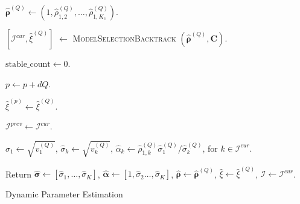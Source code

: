 \begin{algorithm}[!ht]
{{    %
        
        
    }

    $\widehat{\boldsymbol{\rho}}^{(Q)} \gets (1,\widehat{\rho}_{1,2}^{(Q)}, \dots, \widehat{\rho}_{1,K_c}^{(Q)})$.


    $\left[\mathcal{I}^{cur},\widehat{\xi}^{(Q)}\right]$ $\gets$ \textsc{ModelSelectionBacktrack} $\left(\widehat{\boldsymbol{\rho}}^{(Q)},\boldsymbol{C}\right)$.\\

    {
            $\text{stable}\_\text{count} \gets  0$.
    
        $p \gets  p+dQ$. %
        
        $\widehat{\xi}^{(p)} \gets  \widehat{\xi}^{(Q)}$.
    }
    

    $\mathcal{I}^{prev} \gets \mathcal{I}^{cur}$.
    }
    
$\widehat{\sigma}_1 \gets \sqrt{v_1^{(Q)}}$, $\widehat{\sigma}_k \gets \sqrt{v_k^{(Q)}}$, $\widehat{\alpha}_k \gets \widehat{\rho}_{1,k}^{(Q)} \widehat{\sigma}_1^{(Q)} / \widehat{\sigma}_k^{(Q)}$, for $k \in \mathcal{I}^{cur}$.

Return $\widehat{\boldsymbol{\sigma}} \gets [\widehat{\sigma}_1,\ldots,\widehat{\sigma}_{K}]$, $\widehat{\boldsymbol{\alpha}} \gets [1,\widehat{\sigma}_2\ldots,\widehat{\sigma}_{K}]$, $\widehat{\boldsymbol{\rho}} \gets \widehat{\boldsymbol{\rho}}^{(Q)}$, $\widehat{\xi} \gets \widehat{\xi}^{(Q)}$, $\mathcal{I} \gets \mathcal{I}^{cur}$.
\caption{Dynamic Parameter Estimation}
\end{algorithm}
\ULforem
%






